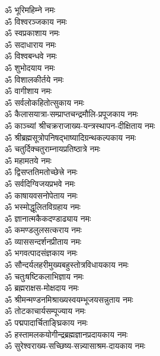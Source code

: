 \begin{multicols}{2}
\begin{flushleft}
        ॐ भूरिमहिम्ने नमः\\
        ॐ विश्वरञ्जकाय नमः\\
        ॐ स्वप्रकाशाय नमः\\
        ॐ सदाधाराय नमः\\
        ॐ विश्वबन्धवे नमः\\
        ॐ शुभोदयाय नमः\\
        ॐ विशालकीर्तये नमः\\
        ॐ वागीशाय नमः\\
        ॐ सर्वलोकहितोत्सुकाय नमः\\
        ॐ कैलासयात्रा-सम्प्राप्त\-चन्द्र\-मौलि-प्रपूजकाय नमः\hfill{}\\
                                        
        ॐ काञ्च्यां श्रीचक्रराजाख्य-यन्त्रस्थापन-दीक्षिताय नमः\\
        ॐ श्रीब्रह्मसूत्रोपनिषद्\-भाष्यादि\-ग्रन्थ\-कल्पकाय नमः\\
        ॐ चतुर्दिक्चतुराम्नायप्रतिष्ठात्रे नमः\\
        ॐ महामतये नमः\\
        ॐ द्विसप्ततिमतोच्छेत्त्रे नमः\\
        ॐ सर्वदिग्विजयप्रभवे नमः\\
        ॐ काषायवसनोपेताय नमः\\
        ॐ भस्मोद्धूलितविग्रहाय नमः\\
        ॐ ज्ञानात्मकैकदण्डाढ्याय नमः\\
        ॐ कमण्डलुलसत्कराय नमः\hfill{}\\
                                        
        ॐ व्याससन्दर्शनप्रीताय नमः\\
        ॐ भगवत्पादसंज्ञकाय नमः\\
        ॐ सौन्दर्यलहरी\-मुख्य\-बहु\-स्तोत्र\-विधाय\-काय नमः\\
        ॐ चतुःषष्टिकलाभिज्ञाय नमः\\
        ॐ ब्रह्मराक्षस-मोक्षदाय नमः\\
        ॐ श्रीमन्मण्डन\-मिश्राख्य\-स्वयम्भू\-जय\-सन्नुताय नमः\\
        ॐ तोटकाचार्यसम्पूज्याय नमः\\
        ॐ पद्मपादार्चिताङ्घ्रिकाय नमः\\
        ॐ हस्तामलक\-योगीन्द्र\-ब्रह्म\-ज्ञान\-प्रदायकाय नमः\\
        ॐ सुरेश्वराख्य-सच्छिष्य-सन्न्यासाश्रम-दायकाय नमः\hfill{}\\
                        

\end{flushleft}
\end{multicols}
